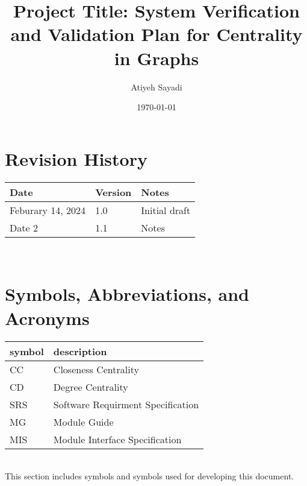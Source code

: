 \documentclass[12pt, titlepage]{article}
\begin{document}
\title{Project Title: System Verification and Validation Plan for Centrality in Graphs{}} 
\author{Atiyeh Sayadi}
\date{\today}
	
\maketitle


\section*{Revision History}

\begin{tabularx}{\textwidth}{p{3cm}p{2cm}X}
\toprule {\bf Date} & {\bf Version} & {\bf Notes}\\
\midrule
Feburary 14,  2024 & 1.0 & Initial draft\\
Date 2 & 1.1 & Notes\\
\bottomrule
\end{tabularx}

~\\


\newpage

\tableofcontents

\listoftables
{}

\listoffigures
{}

\newpage

\section{Symbols, Abbreviations, and Acronyms}

\renewcommand{\arraystretch}{1.2}
\begin{tabular}{l l} 
  \toprule		
  \textbf{symbol} & \textbf{description}\\
  \midrule 
  CC& Closeness Centrality \\
  CD& Degree Centrality  \\
SRS & Software Requirment Specification\\
MG& Module Guide\\
MIS& Module Interface Specification\\
  \bottomrule
\end{tabular}\\

This section includes symbols and symbols used for developing this document.
\end{document}
